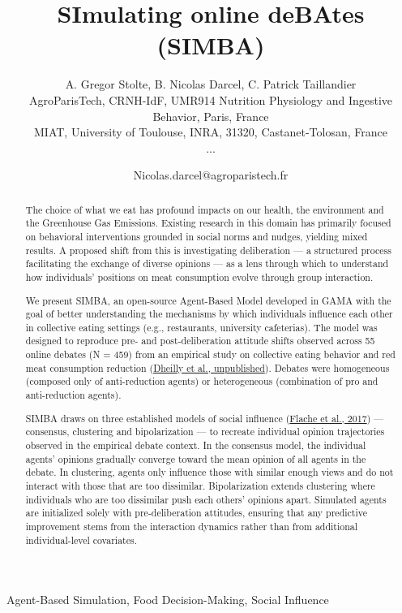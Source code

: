 \documentclass{gamadays}
\title{\textbf{SImulating online deBAtes (SIMBA)}}
\author{A. Gregor Stolte\up{1}, B. Nicolas Darcel\up{1}, C. Patrick Taillandier\up{2}\\[6pt]
\up{1} AgroParisTech, CRNH-IdF, UMR914 Nutrition Physiology and Ingestive Behavior, Paris, France\\
\up{2} MIAT, University of Toulouse, INRA, 31320, Castanet-Tolosan, France\\
...}
\date{Nicolas.darcel@agroparistech.fr}
\begin{document}
\maketitle


\begin{keywords}
Agent-Based Simulation, Food Decision-Making, Social Influence
\end{keywords}

\begin{abstract}
The choice of what we eat has profound impacts on our health, the environment and the Greenhouse Gas Emissions. Existing research in this domain has primarily focused on behavioral interventions grounded in social norms and nudges, yielding mixed results. A proposed shift from this is investigating deliberation — a structured process facilitating the exchange of diverse opinions — as a lens through which to understand how individuals' positions on meat consumption evolve through group interaction.\newline

We present SIMBA, an open-source Agent-Based Model developed in GAMA with the goal of better understanding the mechanisms by which individuals influence each other in collective eating settings (e.g., restaurants, university cafeterias). The model was designed to reproduce pre- and post-deliberation attitude shifts observed across 55 online debates (N = 459) from an empirical study on collective eating behavior and red meat consumption reduction (\hyperlink{dheilly}{Dheilly et al., unpublished}). Debates were homogeneous (composed only of anti-reduction agents) or heterogeneous (combination of pro and anti-reduction agents).\newline

SIMBA draws on three established models of social influence (\hyperlink{flache}{Flache et al., 2017}) — consensus, clustering and bipolarization — to recreate individual opinion trajectories observed in the empirical debate context. In the consensus model, the individual agents' opinions gradually converge toward the mean opinion of all agents in the debate. In clustering, agents only influence those with similar enough views and do not interact with those that are too dissimilar. Bipolarization extends clustering where individuals who are too dissimilar push each others' opinions apart. Simulated agents are initialized solely with pre-deliberation attitudes, ensuring that any predictive improvement stems from the interaction dynamics rather than from additional individual-level covariates. \newline


\end{abstract}
\end{document}
